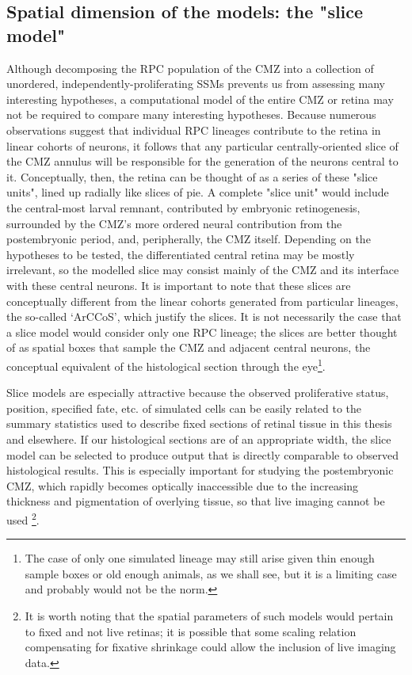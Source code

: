 \subsection{Spatial dimension of the models: the "slice model"}
Although decomposing the RPC population of the CMZ into a collection of unordered, independently-proliferating SSMs prevents us from assessing many interesting hypotheses, a computational model of the entire CMZ or retina may not be required to compare many interesting hypotheses. Because numerous observations suggest that individual RPC lineages contribute to the retina in linear cohorts of neurons, it follows that any particular centrally-oriented slice of the CMZ annulus will be responsible for the generation of the neurons central to it. Conceptually, then, the retina can be thought of as a series of these "slice units", lined up radially like slices of pie. A complete "slice unit" would include the central-most larval remnant, contributed by embryonic retinogenesis, surrounded by the CMZ's more ordered neural contribution from the postembryonic period, and, peripherally, the CMZ itself. Depending on the hypotheses to be tested, the differentiated central retina may be mostly irrelevant, so the modelled slice may consist mainly of the CMZ and its interface with these central neurons. It is important to note that these slices are conceptually different from the linear cohorts generated from particular lineages, the so-called `ArCCoS', which justify the slices. It is not necessarily the case that a slice model would consider only one RPC lineage; the slices are better thought of as spatial boxes that sample the CMZ and adjacent central neurons, the conceptual equivalent of the histological section through the eye\footnote{The case of only one simulated lineage may still arise given thin enough sample boxes or old enough animals, as we shall see, but it is a limiting case and probably would not be the norm.}.

Slice models are especially attractive because the observed proliferative status, position, specified fate, etc. of simulated cells can be easily related to the summary statistics used to describe fixed sections of retinal tissue in this thesis and elsewhere. If our histological sections are of an appropriate width, the slice model can be selected to produce output that is directly comparable to observed histological results. This is especially important for studying the postembryonic CMZ, which rapidly becomes optically inaccessible due to the increasing thickness and pigmentation of overlying tissue, so that live imaging cannot be used \footnote{It is worth noting that the spatial parameters of such models would pertain to fixed and not live retinas; it is possible that some scaling relation compensating for fixative shrinkage could allow the inclusion of live imaging data.}.

